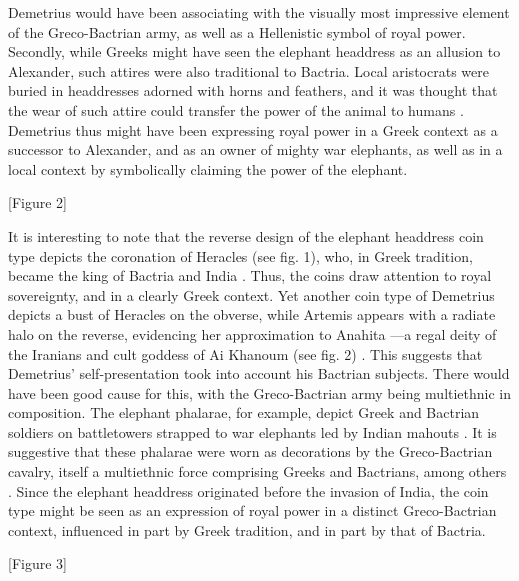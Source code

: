 \documentclass{ijsra}
\begin{document}
Demetrius would have been associating with the visually most impressive element of the Greco-Bactrian army,
as well as a Hellenistic symbol of royal power.
Secondly, while Greeks might have seen the elephant headdress as an allusion to Alexander, such attires were also traditional to Bactria.
Local aristocrats were buried in headdresses adorned with horns and feathers,
and it was thought that the wear of such attire could transfer the power of the animal to humans \parencite[215--226]{Lerner2009}.
Demetrius thus might have been expressing royal power in a Greek context as a successor to Alexander,
and as an owner of mighty war elephants, as well as in a local context by symbolically claiming the power of the elephant.

[Figure 2]

It is interesting to note that the reverse design of the elephant headdress coin type depicts the coronation of Heracles (see fig. 1),%
who, in Greek tradition, became the king of Bactria and India \parencites[70--80]{Bukharin2004}[140]{Stanco2012}.
Thus, the coins draw attention to royal sovereignty, and in a clearly Greek context.
Yet another coin type of Demetrius depicts a bust of Heracles on the obverse, while Artemis appears with a radiate halo on the reverse,
evidencing her approximation to Anahita —a regal deity of the Iranians and cult goddess of Ai Khanoum (see fig. 2) %
\parencite[242]{MacDowall2007b}.
This suggests that Demetrius’ self-presentation took into account his Bactrian subjects.
There would have been good cause for this, with the Greco-Bactrian army being multiethnic in composition.
The elephant phalarae, for example, depict Greek and Bactrian soldiers on battletowers strapped to war elephants led by Indian mahouts
\parencites[10]{Pfrommer1993}[588]{Treister1999}.
It is suggestive that these phalarae were worn as decorations by the Greco-Bactrian cavalry, itself a multiethnic force comprising
Greeks and Bactrians, among others \parencite[50--51]{Lerner1999}.
Since the elephant headdress originated before the invasion of India, the coin type might be seen as an expression of royal power
in a distinct Greco-Bactrian context, influenced in part by Greek tradition, and in part by that of Bactria.

[Figure 3]
\end{document}
